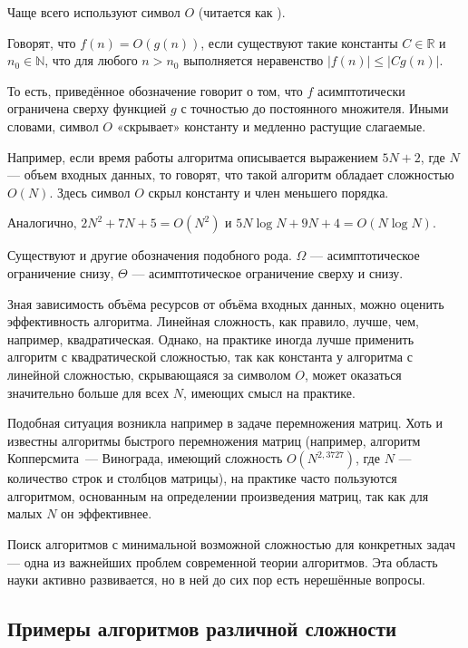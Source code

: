 Чаще всего используют символ $O$ (читается как ).

\begin{defn}
  Говорят, что $f(n)=O(g(n))$, если существуют такие константы
  $C\in\mathbb{R}$ и $n_{0}\in\mathbb{N}$, что для любого $n>n_{0}$
  выполняется неравенство $|f(n)|\leqslant|Cg(n)|$.
\end{defn}

То есть, приведённое обозначение говорит о том, что $f$ асимптотически
ограничена сверху функцией $g$ с точностью до постоянного
множителя. Иными словами, символ $O$ «скрывает» константу и медленно
растущие слагаемые.

Например, если время работы алгоритма описывается выражением $5N+2$,
где $N$ — объем входных данных, то говорят, что такой алгоритм
обладает сложностью $O(N)$. Здесь символ $O$ скрыл константу и член
меньшего порядка.

Аналогично, $2N^2+7N+5 = O(N^2)$ и $5N\log N + 9N + 4 = O(N\log N)$.

Существуют и другие обозначения подобного рода. $\Omega$ —
асимптотическое ограничение снизу, $\Theta$ — асимптотическое
ограничение сверху и снизу.

Зная зависимость объёма ресурсов от объёма входных данных, можно
оценить эффективность алгоритма. Линейная сложность, как правило,
лучше, чем, например, квадратическая.  Однако, на практике иногда
лучше применить алгоритм с квадратической сложностью, так как
константа у алгоритма с линейной сложностью, скрывающаяся за символом
$O$, может оказаться значительно больше для всех $N$, имеющих смысл на
практике.

Подобная ситуация возникла например в задаче перемножения матриц. Хоть
и известны алгоритмы быстрого перемножения матриц (например, алгоритм
Копперсмита~— Винограда, имеющий сложность $O(N^{2{,}3727})$, где $N$
— количество строк и столбцов матрицы), на практике часто пользуются
алгоритмом, основанным на определении произведения матриц, так как для
малых $N$ он эффективнее.

Поиск алгоритмов с минимальной возможной сложностью для конкретных
задач — одна из важнейших проблем современной теории алгоритмов. Эта
область науки активно развивается, но в ней до сих пор есть нерешённые
вопросы.

\subsection{Примеры алгоритмов различной сложности}

